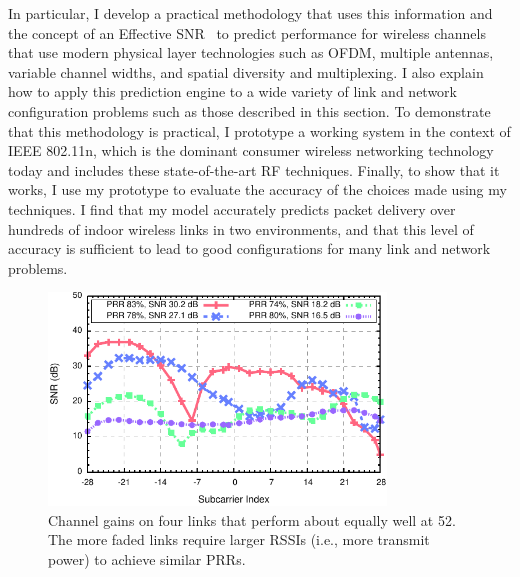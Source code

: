 In particular, I develop a practical methodology that uses this information and the concept of an Effective SNR~\cite{Nanda_EffectiveSNR} to predict performance for wireless channels that use modern physical layer technologies such as OFDM, multiple antennas, variable channel widths, and spatial diversity and multiplexing. I also explain how to apply this prediction engine to a wide variety of link and network configuration problems such as those described in this section. To demonstrate that this methodology is practical, I prototype a working system in the context of IEEE 802.11n, which is the dominant consumer wireless networking technology today and includes these state-of-the-art RF techniques. Finally, to show that it works, I use my prototype to evaluate the accuracy of the choices made using my techniques. I find that my model accurately predicts packet delivery over hundreds of indoor wireless links in two environments, and that this level of accuracy is sufficient to lead to good configurations for many link and network problems.

\begin{figure}[t]
  \centering
  \includegraphics[width=0.8\textwidth]{figures/fsf_shape.pdf}
  \caption[Channel gains on four links that perform about equally well at 52\Mbps]{Channel gains on four links that perform about equally well at 52\Mbps. The more faded links require larger RSSIs (i.e., more transmit power) to achieve similar PRRs.}
  \label{fig:example_fsf_shape}

\end{figure}

